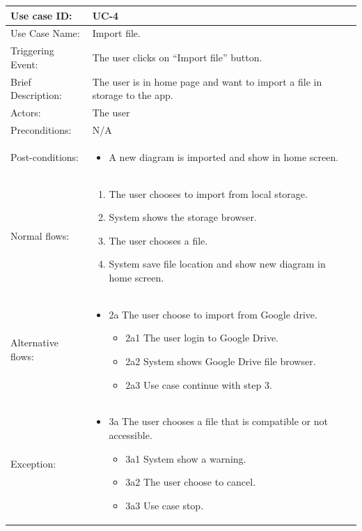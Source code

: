 \begin{table}[]
\begin{tabular}{| m{4cm} | m{11cm} |}
\hline
Use case ID:       & UC-4 \\ \hline
Use Case Name:     & Import file. \\ \hline
Triggering Event:  & The user clicks on “Import file” button. \\ \hline
Brief Description: & The user is in home page and want to import a file in storage to the app. \\ \hline
Actors:            & The user \\ \hline
Preconditions:     & N/A\\ \hline
Post-conditions:   & \begin{itemize}
    \item A new diagram is imported and show in home screen.
\end{itemize} \\ \hline
Normal flows:      & \begin{enumerate}
    \item The user chooses to import from local storage.
    \item System shows the storage browser.
    \item The user chooses a file.
    \item System save file location and show new diagram in home screen.
\end{enumerate} \\ \hline
Alternative flows: & \begin{itemize}
    \item {2a The user choose to import from Google drive.}
    \begin{itemize}
        \item 2a1 The user login to Google Drive.
        \item 2a2 System shows Google Drive file browser.
        \item 2a3 Use case continue with step 3.
    \end{itemize}
\end{itemize} \\ \hline
Exception: & \begin{itemize}
    \item {3a The user chooses a file that is compatible or not accessible.}
    \begin{itemize}
        \item 3a1 System show a warning.
        \item 3a2 The user choose to cancel.
        \item 3a3 Use case stop.
    \end{itemize}
\end{itemize} \\ \hline
\end{tabular}
\end{table}

